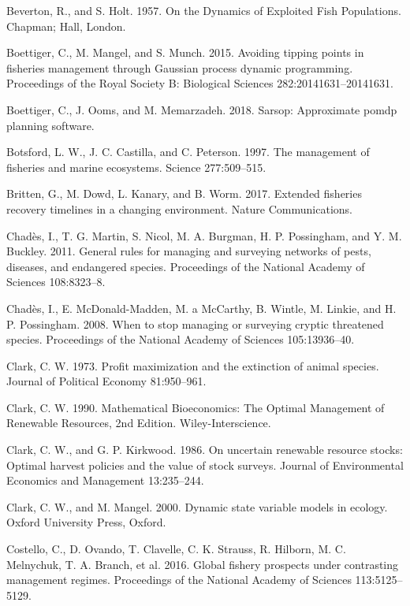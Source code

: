 \documentclass[3p]{elsarticle} %
\begin{document}
\hypertarget{ref-Beverton1957}{}
Beverton, R., and S. Holt. 1957. On the Dynamics of Exploited Fish
Populations. Chapman; Hall, London.

\hypertarget{ref-Boettiger2015}{}
Boettiger, C., M. Mangel, and S. Munch. 2015. Avoiding tipping points in
fisheries management through Gaussian process dynamic programming.
Proceedings of the Royal Society B: Biological Sciences
282:20141631--20141631.

\hypertarget{ref-sarsop-pkg}{}
Boettiger, C., J. Ooms, and M. Memarzadeh. 2018. Sarsop: Approximate
pomdp planning software.

\hypertarget{ref-Botsford1997}{}
Botsford, L. W., J. C. Castilla, and C. Peterson. 1997. The management
of fisheries and marine ecosystems. Science 277:509--515.

\hypertarget{ref-Britten2017}{}
Britten, G., M. Dowd, L. Kanary, and B. Worm. 2017. Extended fisheries
recovery timelines in a changing environment. Nature Communications.

\hypertarget{ref-Chades2011}{}
Chadès, I., T. G. Martin, S. Nicol, M. A. Burgman, H. P. Possingham, and
Y. M. Buckley. 2011. General rules for managing and surveying networks
of pests, diseases, and endangered species. Proceedings of the National
Academy of Sciences 108:8323--8.

\hypertarget{ref-Chades2008}{}
Chadès, I., E. McDonald-Madden, M. a McCarthy, B. Wintle, M. Linkie, and
H. P. Possingham. 2008. When to stop managing or surveying cryptic
threatened species. Proceedings of the National Academy of Sciences
105:13936--40.

\hypertarget{ref-Clark1973}{}
Clark, C. W. 1973. Profit maximization and the extinction of animal
species. Journal of Political Economy 81:950--961.

\hypertarget{ref-Clark1990}{}
Clark, C. W. 1990. Mathematical Bioeconomics: The Optimal Management of
Renewable Resources, 2nd Edition. Wiley-Interscience.

\hypertarget{ref-Clark1986}{}
Clark, C. W., and G. P. Kirkwood. 1986. On uncertain renewable resource
stocks: Optimal harvest policies and the value of stock surveys. Journal
of Environmental Economics and Management 13:235--244.

\hypertarget{ref-Clark2000}{}
Clark, C. W., and M. Mangel. 2000. Dynamic state variable models in
ecology. Oxford University Press, Oxford.

\hypertarget{ref-Costello2016}{}
Costello, C., D. Ovando, T. Clavelle, C. K. Strauss, R. Hilborn, M. C.
Melnychuk, T. A. Branch, et al. 2016. Global fishery prospects under
contrasting management regimes. Proceedings of the National Academy of
Sciences 113:5125--5129.
\end{document}
